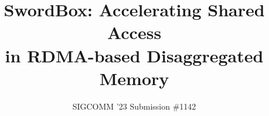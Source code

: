 \documentclass[sigconf,10pt]{acmart}
\newcommand{\sword}{SwordBox}
\begin{document}

\title{\sword: Accelerating Shared Access\\in RDMA-based Disaggregated Memory}

\author{SIGCOMM '23 Submission \#1142}




\maketitle



% 
% 
% 




% 


\balance
\vspace{-0.3cm}
{\footnotesize 
}
\vspace{-0.5cm}

\appendix

\end{document}
